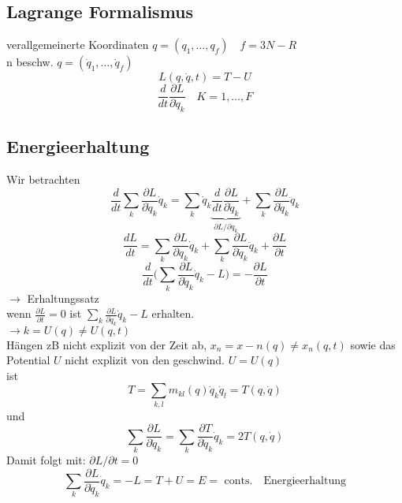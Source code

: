 \documentclass[titlepage,12pt,a4paper,ngerman]{report}
\newcommand{\tx}[1]{\textrm{#1}}
\begin{document}
{\subsection{Lagrange Formalismus}
verallgemeinerte Koordinaten $q = ( q_1, \dots , q_f) \quad f = 3N-R$\\ 
n beschw. $q = (\dot q_1, \dots , \dot q_f)$
$$L ( q, \dot q, t) = T- U$$
$$\frac{d}{dt} \frac{\partial L}{\partial \dot q_k} \quad K = 1, \dots, F$$
\subsection{Energieerhaltung}
Wir betrachten
$$\frac{d}{dt} \sum_k \frac{\partial L}{\partial \dot q_k} \dot q_k  = \sum_k \dot q_k \underbrace{\frac{d}{dt} \frac{\partial L}{\partial \dot q_k}}_{\partial L / \partial q_k} + \sum_k \frac{\partial L}{\partial \dot q_k} \ddot q_k$$
$$\frac{dL}{dt}= \sum_k \frac{\partial L}{\partial q_k} \dot q_k + \sum_k \frac{\partial L}{\partial \dot q_k} \ddot q_k + \frac{\partial L}{\partial t}$$
$$\frac{d}{dt} \bigg( \sum_k \frac{\partial L}{\partial \dot q_k} \dot q_k - L \bigg) = -\frac{\partial L}{\partial t}$$
$\rightarrow$ Erhaltungssatz\\
wenn $\frac{\partial L}{\partial t} = 0$ ist $\sum_k \frac{\partial L}{\partial \dot q_k} \dot q_k - L$ erhalten.\\
$\rightarrow k = U(q) \neq U(q,t)$\\
Hängen zB nicht explizit von der Zeit ab, $x_n = x-n(q) \neq x_n (q,t)$ sowie das Potential $U$ nicht explizit von den geschwind. $U = U(q)$\\
ist $$T = \sum_{k,l} m_{kl}(q) \dot q_k \dot q_l = T (q, \dot q)$$
und $$\sum_{k} \frac{\partial L}{\partial \dot q_k} = \sum_{k} \frac{\partial T}{\partial \dot q_k} \dot q_k = 2T(q,\dot q)$$
Damit folgt mit: $\partial L/ \partial t = 0$
$$\sum_k \frac{\partial L }{\partial \dot q_k}\dot q_k = - L = T+U = E = \tx{ conts.} \quad \tx{Energieerhaltung}$$
}
\end{document}
